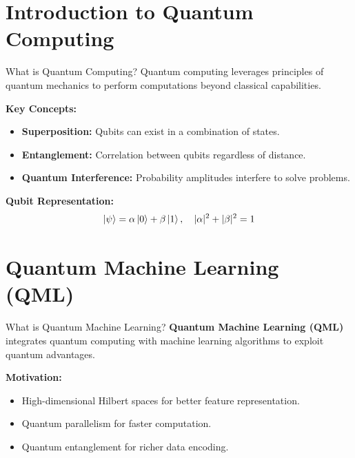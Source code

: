 \documentclass{beamer}
\begin{document}
\section{Introduction to Quantum Computing}
\begin{frame}{What is Quantum Computing?}
Quantum computing leverages principles of quantum mechanics to perform computations beyond classical capabilities.

\vspace{10pt}
\textbf{Key Concepts:}
\begin{itemize}
\item \textbf{Superposition:} Qubits can exist in a combination of states.
\item \textbf{Entanglement:} Correlation between qubits regardless of distance.
\item \textbf{Quantum Interference:} Probability amplitudes interfere to solve problems.
\end{itemize}

\textbf{Qubit Representation:}
\[
\ket{\psi} = \alpha \ket{0} + \beta \ket{1}, \quad |\alpha|^2 + |\beta|^2 = 1
\]
\end{frame}


\section{Quantum Machine Learning (QML)}
\begin{frame}{What is Quantum Machine Learning?}
\textbf{Quantum Machine Learning (QML)} integrates quantum computing with machine learning algorithms to exploit quantum advantages.

\vspace{10pt}
\textbf{Motivation:}
\begin{itemize}
    \item High-dimensional Hilbert spaces for better feature representation.
    \item Quantum parallelism for faster computation.
    \item Quantum entanglement for richer data encoding.
\end{itemize}


\end{frame}
\end{document}
